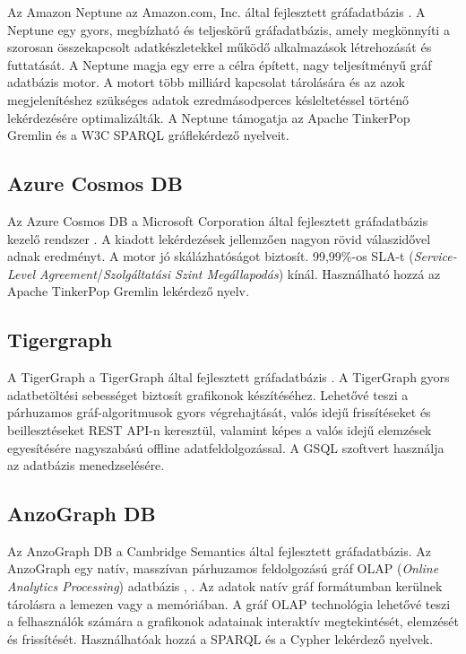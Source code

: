 Az Amazon Neptune az Amazon.com, Inc. által fejlesztett gráfadatbázis \cite{neptune}. A Neptune egy gyors, megbízható és teljeskörű gráfadatbázis, amely megkönnyíti a szorosan összekapcsolt adatkészletekkel működő alkalmazások létrehozását és futtatását. A Neptune magja egy erre a célra épített, nagy teljesítményű gráf adatbázis motor. A motort több milliárd kapcsolat tárolására és az azok megjelenítéshez szükséges adatok ezredmásodperces késleltetéssel történő lekérdezésére optimalizálták. A Neptune támogatja az Apache TinkerPop Gremlin és a W3C SPARQL gráflekérdező nyelveit.

\subsection{Azure Cosmos DB}

Az Azure Cosmos DB a Microsoft Corporation által fejlesztett gráfadatbázis kezelő rendszer \cite{azure}. A kiadott lekérdezések jellemzően nagyon rövid válaszidővel adnak eredményt. A motor jó skálázhatóságot biztosít. 99,99\%-os SLA-t (\textit{Service-Level Agreement}/\textit{Szolgáltatási Szint Megállapodás}) kínál. Használható hozzá az Apache TinkerPop Gremlin lekérdező nyelv.

\subsection{Tigergraph}

A TigerGraph a TigerGraph által fejlesztett gráfadatbázis \cite{tigergraph}. A TigerGraph gyors adatbetöltési sebességet biztosít grafikonok készítéséhez. Lehetővé teszi a párhuzamos gráf-algoritmusok gyors végrehajtását, valós idejű frissítéseket és beillesztéseket REST API-n keresztül, valamint képes a valós idejű elemzések egyesítésére nagyszabású offline adatfeldolgozással. A GSQL szoftvert használja az adatbázis menedzselésére.

\subsection{AnzoGraph DB}

Az AnzoGraph DB a Cambridge Semantics által fejlesztett gráfadatbázis. Az AnzoGraph egy natív, masszívan párhuzamos feldolgozású gráf OLAP (\textit{Online Analytics Processing}) adatbázis \cite{anzograph1}, \cite{anzograph2}. Az adatok natív gráf formátumban kerülnek tárolásra a lemezen vagy a memóriában. A gráf OLAP technológia lehetővé teszi a felhasználók számára a grafikonok adatainak interaktív megtekintését, elemzését és frissítését. Használhatóak hozzá a SPARQL és a Cypher lekérdező nyelvek.

